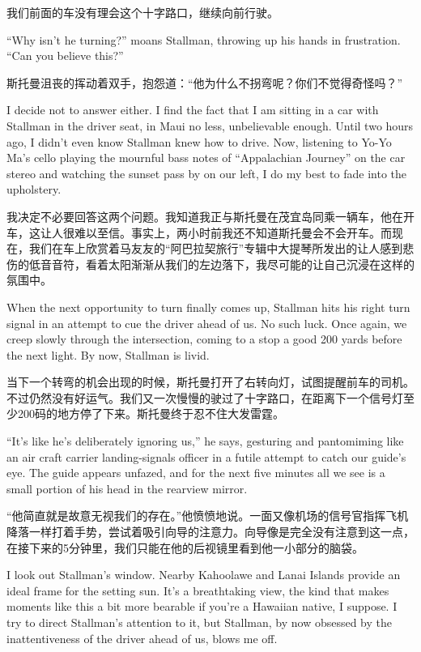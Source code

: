 \ifdefined\chs
我们前面的车没有理会这个十字路口，继续向前行驶。
\fi

\ifdefined\eng
``Why isn't he turning?'' moans Stallman, throwing up his hands in frustration. ``Can you believe this?''
\fi

\ifdefined\chs
斯托曼沮丧的挥动着双手，抱怨道：``他为什么不拐弯呢？你们不觉得奇怪吗？''
\fi

\ifdefined\eng
I decide not to answer either. I find the fact that I am sitting in a car with Stallman in the driver seat, in Maui no less, unbelievable enough. Until two hours ago, I didn't even know Stallman knew how to drive. Now, listening to Yo-Yo Ma's cello playing the mournful bass notes of ``Appalachian Journey'' on the car stereo and watching the sunset pass by on our left, I do my best to fade into the upholstery.
\fi

\ifdefined\chs
我决定不必要回答这两个问题。我知道我正与斯托曼在茂宜岛同乘一辆车，他在开车，这让人很难以至信。事实上，两小时前我还不知道斯托曼会不会开车。而现在，我们在车上欣赏着马友友的``阿巴拉契旅行''专辑中大提琴所发出的让人感到悲伤的低音音符，看着太阳渐渐从我们的左边落下，我尽可能的让自己沉浸在这样的氛围中。
\fi

\ifdefined\eng
When the next opportunity to turn finally comes up, Stallman hits his right turn signal in an attempt to cue the driver ahead of us. No such luck. Once again, we creep slowly through the intersection, coming to a stop a good 200 yards before the next light. By now, Stallman is livid.
\fi

\ifdefined\chs
当下一个转弯的机会出现的时候，斯托曼打开了右转向灯，试图提醒前车的司机。不过仍然没有好运气。我们又一次慢慢的驶过了十字路口，在距离下一个信号灯至少200码的地方停了下来。斯托曼终于忍不住大发雷霆。
\fi

\ifdefined\eng
``It's like he's deliberately ignoring us,'' he says, gesturing and pantomiming like an air craft carrier landing-signals officer in a futile attempt to catch our guide's eye. The guide appears unfazed, and for the next five minutes all we see is a small portion of his head in the rearview mirror.
\fi

\ifdefined\chs
``他简直就是故意无视我们的存在。''他愤愤地说。一面又像机场的信号官指挥飞机降落一样打着手势，尝试着吸引向导的注意力。向导像是完全没有注意到这一点，在接下来的5分钟里，我们只能在他的后视镜里看到他一小部分的脑袋。
\fi

\ifdefined\eng
I look out Stallman's window. Nearby Kahoolawe and Lanai Islands provide an ideal frame for the setting sun. It's a breathtaking view, the kind that makes moments like this a bit more bearable if you're a Hawaiian native, I suppose. I try to direct Stallman's attention to it, but Stallman, by now obsessed by the inattentiveness of the driver ahead of us, blows me off.
\fi

